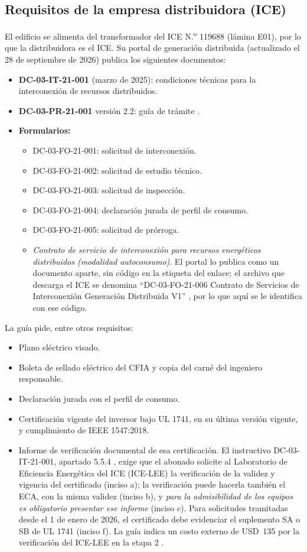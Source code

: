 \documentclass[12pt]{article}
\begin{document}
\subsection{Requisitos de la empresa distribuidora (ICE)}
El edificio se alimenta del transformador del ICE N.\textsuperscript{o} 119688 (lámina E01), por lo que la distribuidora es el ICE. Su portal de generación distribuida (actualizado el 28 de septiembre de 2026) \cite{iceGD} publica los siguientes documentos:
\begin{itemize}
\item \textbf{DC-03-IT-21-001} (marzo de 2025): condiciones técnicas para la interconexión de recursos distribuidos.
\item \textbf{DC-03-PR-21-001} versión 2.2: guía de trámite \cite{iceGuia}.
\item \textbf{Formularios:}
  \begin{itemize}
  \item DC-03-FO-21-001: solicitud de interconexión.
  \item DC-03-FO-21-002: solicitud de estudio técnico.
  \item DC-03-FO-21-003: solicitud de inspección.
  \item DC-03-FO-21-004: declaración jurada de perfil de consumo.
  \item DC-03-FO-21-005: solicitud de prórroga.
  \item \emph{Contrato de servicio de interconexión para recursos energéticos distribuidos (modalidad autoconsumo)}. El portal lo publica como un documento aparte, sin código en la etiqueta del enlace; el archivo que descarga el ICE se denomina ``DC-03-FO-21-006 Contrato de Servicios de Interconexión Generación Distribuida V1'' \cite{iceContrato}, por lo que aquí se le identifica con ese código.
  \end{itemize}
\end{itemize}

La guía \cite{iceGuia} pide, entre otros requisitos:
\begin{itemize}
\item Plano eléctrico visado.
\item Boleta de sellado eléctrico del CFIA y copia del carné del ingeniero responsable.
\item Declaración jurada con el perfil de consumo.
\item Certificación vigente del inversor bajo UL 1741, en su última versión vigente, y cumplimiento de IEEE 1547:2018.
\item Informe de verificación documental de esa certificación. El instructivo DC-03-IT-21-001, apartado 5.5.4 \cite{iceIT}, exige que el abonado solicite al Laboratorio de Eficiencia Energética del ICE (ICE-LEE) la verificación de la validez y vigencia del certificado (inciso a); la verificación puede hacerla también el ECA, con la misma validez (inciso b), y \emph{para la admisibilidad de los equipos es obligatorio presentar ese informe} (inciso c). Para solicitudes tramitadas desde el 1 de enero de 2026, el certificado debe evidenciar el suplemento SA o SB de UL 1741 (inciso f). La guía indica un costo externo de USD~135 por la verificación del ICE-LEE en la etapa 2 \cite{iceGuia}.
\end{itemize}
\end{document}
